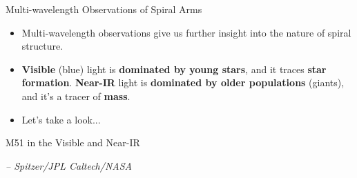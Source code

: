\documentclass[letterpaper,landscape]{slides}
\begin{document}
\begin{slide}
\begin{center}
{\large \color{red} 
                  Multi-wavelength Observations of Spiral Arms  }
\end{center}

\begin{itemize}
\item Multi-wavelength observations give us further insight into the nature
of spiral structure.

\item {\bf Visible} (blue) light is {\bf dominated by young stars}, and it
traces {\bf star formation}.  {\bf Near-IR} light is {\bf dominated by older
populations} (giants), and it's a tracer of {\bf mass}.

\item Let's take a look...

\end{itemize}

\vfill
\end{slide}


\begin{slide}

\begin{center}
{\large \color{red} 
                  M51 in the Visible and Near-IR  }
\end{center}

\begin{center}
\vskip -0.0in
\end{center}

\begin{flushright}
{ \tiny \em -- Spitzer/JPL Caltech/NASA }
\end{flushright}

\end{slide}
\end{document}
